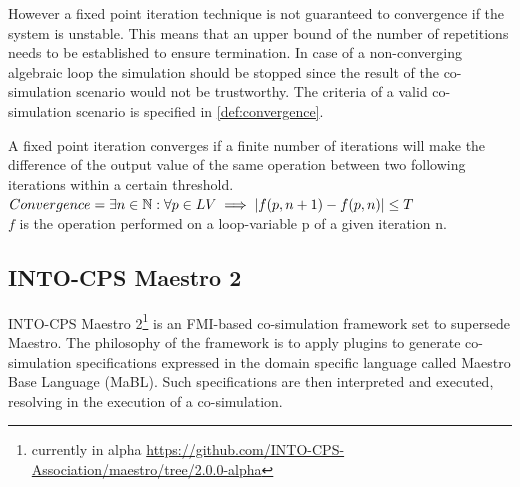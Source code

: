 However a fixed point iteration technique is not guaranteed to convergence if the system is unstable. This means that an upper bound of the number of repetitions needs to be established to ensure termination. In case of a non-converging algebraic loop the simulation should be stopped since the result of the co-simulation scenario would not be trustworthy. The criteria of a valid co-simulation scenario is specified in \cref{def:convergence}.

\begin{definition}\label{def:convergence}
A fixed point iteration converges if a finite number of iterations will make the difference of the output value of the same operation between two following iterations within a certain threshold.\\
$Convergence = \exists n \in \mathbb{N}: \forall p \in LV \implies |f(p, n + 1) - f(p, n)| \leq T$\\
$f$ is the operation performed on a loop-variable p of a given iteration n.
\end{definition}

\subsection{INTO-CPS Maestro 2}
INTO-CPS Maestro 2\footnote{currently in alpha \url{https://github.com/INTO-CPS-Association/maestro/tree/2.0.0-alpha}}\cite{thule_maestro2_2019} is an FMI-based co-simulation framework set to supersede Maestro\cite{Maestro}. The philosophy of the framework is to apply plugins to generate co-simulation specifications expressed in the domain specific language called Maestro Base Language (MaBL). Such specifications are then interpreted and executed, resolving in the execution of a co-simulation.